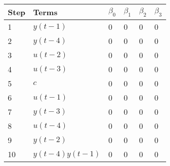 \begin{tabular}{llllll}
Step & Terms & $\beta_{0}$ & $\beta_{1}$ & $\beta_{2}$ & $\beta_{3}$ \\ 
\hline 
1 & $y(t-1)$ & 0 & 0 & 0 & 0 \\ 
2 & $y(t-4)$ & 0 & 0 & 0 & 0 \\ 
3 & $u(t-2)$ & 0 & 0 & 0 & 0 \\ 
4 & $u(t-3)$ & 0 & 0 & 0 & 0 \\ 
5 & $c$ & 0 & 0 & 0 & 0 \\ 
6 & $u(t-1)$ & 0 & 0 & 0 & 0 \\ 
7 & $y(t-3)$ & 0 & 0 & 0 & 0 \\ 
8 & $u(t-4)$ & 0 & 0 & 0 & 0 \\ 
9 & $y(t-2)$ & 0 & 0 & 0 & 0 \\ 
10 & $y(t-4)y(t-1)$ & 0 & 0 & 0 & 0 \\ 
\hline 
\end{tabular}